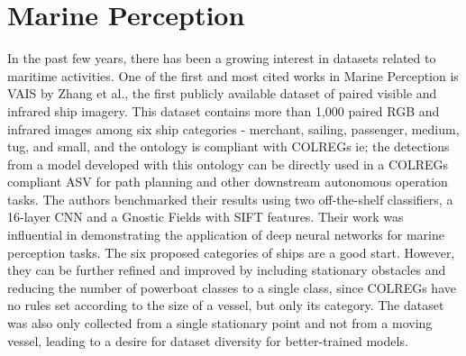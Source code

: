 \section{Marine Perception}
In the past few years, there has been a growing interest in datasets related to maritime activities. One of the first and most cited works in Marine Perception is VAIS by Zhang et al.\cite{Zhang_2015_CVPR_Workshops}, the first publicly available dataset of paired visible and infrared ship imagery. This dataset contains more than 1,000 paired RGB and infrared images among six ship categories - merchant, sailing, passenger, medium, tug, and small, and the ontology is compliant with COLREGs ie; the detections from a model developed with this ontology can be directly used in a COLREGs compliant ASV for path planning and other downstream autonomous operation tasks. The authors benchmarked their results using two off-the-shelf classifiers, a 16-layer CNN and a Gnostic Fields with SIFT features. Their work was influential in demonstrating the application of deep neural networks for marine perception tasks. The six proposed categories of ships are a good start. However, they can be further refined and improved by including stationary obstacles and reducing the number of powerboat classes to a single class, since COLREGs have no rules set according to the size of a vessel, but only its category. The dataset was also only collected from a single stationary point and not from a moving vessel, leading to a desire for dataset diversity for better-trained models. 
\\

